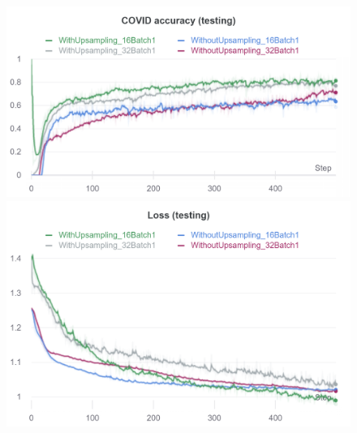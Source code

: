 \documentclass{article}
\begin{document}
\begin{figure}[!htb]
\includegraphics[width=\linewidth]{charts/Section-3-Panel-2-puo6k3y77}
\caption{}
\endminipage\hfill
{}
\includegraphics[width=\linewidth]{charts/Section-3-Panel-3-b3qzbvf33}
\caption{}
\endminipage
\end{figure}
\end{document}
